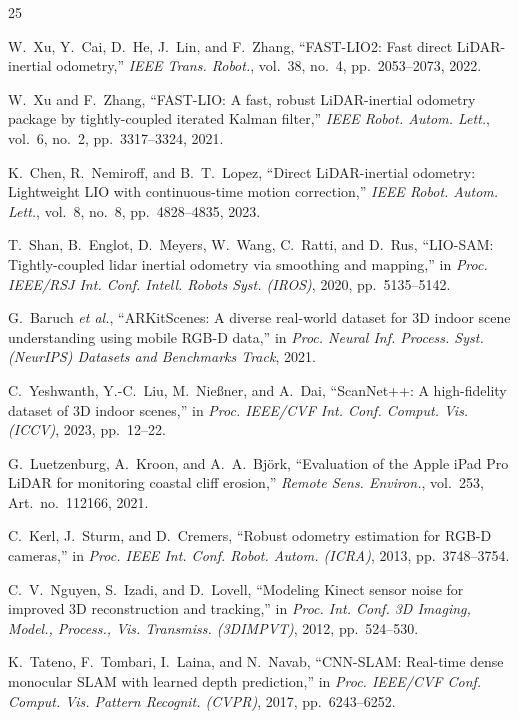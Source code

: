 \documentclass[journal]{IEEEtran}
\begin{document}
\begin{thebibliography}{25}

W.~Xu, Y.~Cai, D.~He, J.~Lin, and F.~Zhang, ``FAST-LIO2: Fast direct LiDAR-inertial odometry,'' \textit{IEEE Trans. Robot.}, vol.~38, no.~4, pp.~2053--2073, 2022.

W.~Xu and F.~Zhang, ``FAST-LIO: A fast, robust LiDAR-inertial odometry package by tightly-coupled iterated Kalman filter,'' \textit{IEEE Robot. Autom. Lett.}, vol.~6, no.~2, pp.~3317--3324, 2021.

K.~Chen, R.~Nemiroff, and B.~T.~Lopez, ``Direct LiDAR-inertial odometry: Lightweight LIO with continuous-time motion correction,'' \textit{IEEE Robot. Autom. Lett.}, vol.~8, no.~8, pp.~4828--4835, 2023.

T.~Shan, B.~Englot, D.~Meyers, W.~Wang, C.~Ratti, and D.~Rus, ``LIO-SAM: Tightly-coupled lidar inertial odometry via smoothing and mapping,'' in \textit{Proc. IEEE/RSJ Int. Conf. Intell. Robots Syst. (IROS)}, 2020, pp.~5135--5142.

G.~Baruch \textit{et al.}, ``ARKitScenes: A diverse real-world dataset for 3D indoor scene understanding using mobile RGB-D data,'' in \textit{Proc. Neural Inf. Process. Syst. (NeurIPS) Datasets and Benchmarks Track}, 2021.

C.~Yeshwanth, Y.-C.~Liu, M.~Nie{\ss}ner, and A.~Dai, ``ScanNet++: A high-fidelity dataset of 3D indoor scenes,'' in \textit{Proc. IEEE/CVF Int. Conf. Comput. Vis. (ICCV)}, 2023, pp.~12--22.

G.~Luetzenburg, A.~Kroon, and A.~A.~Bj\"{o}rk, ``Evaluation of the Apple iPad Pro LiDAR for monitoring coastal cliff erosion,'' \textit{Remote Sens. Environ.}, vol.~253, Art.~no.~112166, 2021.

C.~Kerl, J.~Sturm, and D.~Cremers, ``Robust odometry estimation for RGB-D cameras,'' in \textit{Proc. IEEE Int. Conf. Robot. Autom. (ICRA)}, 2013, pp.~3748--3754.

C.~V.~Nguyen, S.~Izadi, and D.~Lovell, ``Modeling Kinect sensor noise for improved 3D reconstruction and tracking,'' in \textit{Proc. Int. Conf. 3D Imaging, Model., Process., Vis. Transmiss. (3DIMPVT)}, 2012, pp.~524--530.

K.~Tateno, F.~Tombari, I.~Laina, and N.~Navab, ``CNN-SLAM: Real-time dense monocular SLAM with learned depth prediction,'' in \textit{Proc. IEEE/CVF Conf. Comput. Vis. Pattern Recognit. (CVPR)}, 2017, pp.~6243--6252.


\end{thebibliography}
\end{document}

